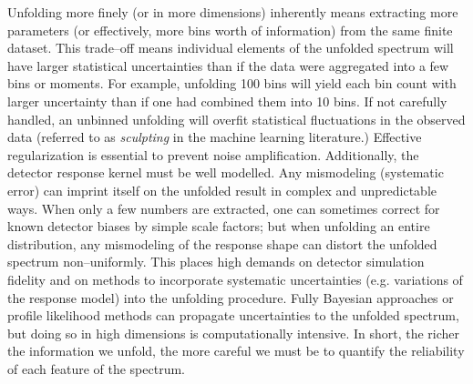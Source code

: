         Unfolding more finely (or in more dimensions) inherently means extracting more parameters (or effectively, more bins worth of information) from the same finite dataset.
        This trade--off means individual elements of the unfolded spectrum will have larger statistical uncertainties than if the data were aggregated into a few bins or moments.
        For example, unfolding 100 bins will yield each bin count with larger uncertainty than if one had combined them into 10 bins.
        If not carefully handled, an unbinned unfolding will overfit statistical fluctuations in the observed data (referred to as \emph{sculpting} in the machine learning literature.)
        Effective regularization is essential to prevent noise amplification.
        Additionally, the detector response kernel must be well modelled.
        Any mismodeling (systematic error) can imprint itself on the unfolded result in complex and unpredictable ways.
        When only a few numbers are extracted, one can sometimes correct for known detector biases by simple scale factors; but when unfolding an entire distribution, any mismodeling of the response shape can distort the unfolded spectrum non--uniformly.
        This places high demands on detector simulation fidelity and on methods to incorporate systematic uncertainties (e.g. variations of the response model) into the unfolding procedure.
        Fully Bayesian approaches or profile likelihood methods can propagate uncertainties to the unfolded spectrum, but doing so in high dimensions is computationally intensive.
        In short, the richer the information we unfold, the more careful we must be to quantify the reliability of each feature of the spectrum.


